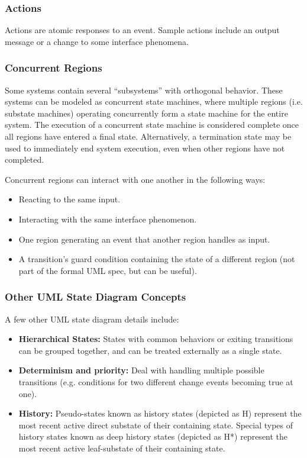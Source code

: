 \documentclass[12pt,titlepage]{article}
\begin{document}
      \subsubsection{Actions}
        Actions are atomic responses to an event. Sample actions include an output message or a change to some interface phenomena.

      \subsubsection{Concurrent Regions}
        Some systems contain several ``subsystems'' with orthogonal behavior. These systems can be modeled as concurrent state machines, where multiple
        regions (i.e. substate machines) operating concurrently form a state machine for the entire system. The execution of a concurrent state machine
        is considered complete once all regions have entered a final state. Alternatively, a termination state may be used to immediately end system
        execution, even when other regions have not completed.

        Concurrent regions can interact with one another in the following ways:
        \begin{itemize}
          \item Reacting to the same input.
          \item Interacting with the same interface phenomenon.
          \item One region generating an event that another region handles as input.
          \item A transition's guard condition containing the state of a different region (not part of the formal UML spec, but can be useful).
        \end{itemize}

      \subsubsection{Other UML State Diagram Concepts}
        A few other UML state diagram details include:
        \begin{itemize}
          \item \textbf{Hierarchical States:} States with common behaviors or exiting transitions can be grouped together, and can be treated externally as a
            single state.
          \item \textbf{Determinism and priority:} Deal with handling multiple possible transitions (e.g. conditions for two different change events
            becoming true at one).
          \item \textbf{History:} Pseudo-states known as history states (depicted as H) represent the most recent active direct substate of their containing state.
            Special types of history states known as deep history states (depicted as H*) represent the most recent active leaf-substate of their containing state.
        \end{itemize}
\end{document}

